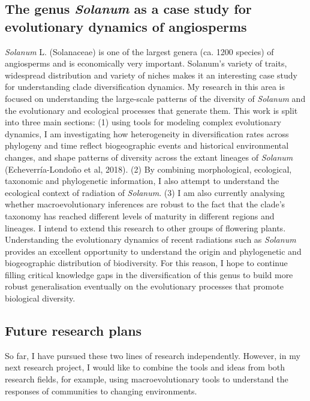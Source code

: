 \documentclass[svgnames,11pt,longbibliography,reqno]{article}
\begin{document}
\subsection*{The genus \textit{Solanum} as a case study for evolutionary dynamics of angiosperms}

\textit{Solanum} L. (Solanaceae) is one of the largest genera (ca. 1200 species) of angiosperms and is economically very important. Solanum's variety of traits, widespread distribution and variety of niches makes it an interesting case study for understanding clade diversification dynamics. My research in this area is focused on understanding the large-scale patterns of the diversity of \textit{Solanum} and the evolutionary and ecological processes that generate them. This work is split into three main sections: (1) using tools for modeling complex evolutionary dynamics, I am investigating how heterogeneity in diversification rates across phylogeny and time reflect biogeographic events and historical environmental changes, and shape patterns of diversity across the extant lineages of \textit{Solanum} (Echeverr\'ia-Londo\~no et al, 2018). (2) By combining morphological, ecological, taxonomic and phylogenetic information, I also attempt to understand the ecological context of radiation of \textit{Solanum}. (3) I am also currently analysing whether macroevolutionary inferences are robust to the fact that the clade's taxonomy has reached different levels of maturity in different regions and lineages. I intend to extend this research to other groups of flowering plants. Understanding the evolutionary dynamics of recent radiations such as \textit{Solanum} provides an excellent opportunity to understand the origin and phylogenetic and biogeographic distribution of biodiversity. For this reason, I hope to continue filling critical knowledge gaps in the diversification of this genus to build more robust generalisation eventually on the evolutionary processes that promote biological diversity.


\subsection*{Future research plans}

So far, I have pursued these two lines of research independently. However, in my next research project, I would like to combine the tools and ideas from both research fields, for example, using macroevolutionary tools to understand the responses of communities to changing environments.
\end{document}
